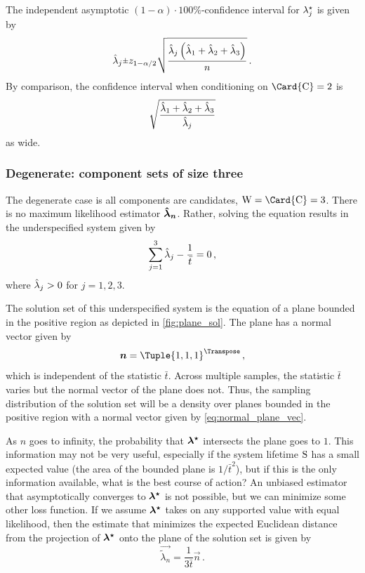 \documentclass[../main.tex]{subfiles}
\begin{document}
The independent asymptotic $(1-\alpha) \cdot 100 \%$-confidence interval for ${\lambda}^{\star}_j$ is given by
\begin{equation}
    \estimator{\lambda}_j \raisebox{.2ex}{$\scriptstyle\pm$} z_{1 - \alpha/2}
    \sqrt{
        \frac
        {
            \estimator{\lambda}_j \left(\estimator{\lambda}_1 + \estimator{\lambda}_2 + \estimator{\lambda}_3\right)
        }
        {n}
    }\,.
\end{equation}
By comparison, the confidence interval when conditioning on $\Card{\rvcand} = 2$ is
\begin{equation}
    \sqrt{
        \frac
        {
            \hat{\lambda}_1 + \hat{\lambda}_2 + \hat{\lambda}_3
        }
        {
            \hat{\lambda}_j
        }
    }
\end{equation}
as wide.

\subsubsection{Degenerate: component sets of size three}
The degenerate case is all components are candidates, $\RV{W} = \Card{\rvcand} = 3$. There is no maximum likelihood estimator $\boldsymbol{\hat{\boldsymbol{\lambda}}_n}$. Rather, solving the equation results in the underspecified system given by
\begin{equation}
    \sum_{j=1}^{3} \hat{\lambda}_j - \frac{1}{\bar{t}} = 0\,,
\end{equation}
where $\hat{\lambda}_j > 0$ for $j=1,2,3$.

The solution set of this underspecified system is the equation of a plane bounded in the positive region as depicted in \cref{fig:plane_sol}. The plane has a normal vector given by
\begin{equation}
\label{eq:normal_plane_vec}
    \vec{n} = \Tuple{1,1,1}^\Transpose\,,
\end{equation}
which is independent of the statistic $\bar{t}$. Across multiple samples, the statistic $\bar{t}$ varies but the normal vector of the plane does not. Thus, the sampling distribution of the solution set will be a density over planes bounded in the positive region with a normal vector given by \cref{eq:normal_plane_vec}.

As $n$ goes to infinity, the probability that $\boldsymbol{{\lambda}^{\star}}$ intersects the plane goes to $1$. This information may not be very useful, especially if the system lifetime $\mathrm{S}$ has a small expected value (the area of the bounded plane is $1/\bar{t}^2$), but if this is the only information available, what is the best course of action? An unbiased estimator that asymptotically converges to $\boldsymbol{{\lambda}^{\star}}$ is not possible, but we can minimize some other loss function. If we assume $\boldsymbol{{\lambda}^{\star}}$ takes on any supported value with equal likelihood, then the estimate that minimizes the expected Euclidean distance from the projection of $\boldsymbol{{\lambda}^{\star}}$ onto the plane of the solution set is given by
\begin{equation}
    \vec{\tilde\lambda_n} = \frac{1}{3 \bar{t}} \vec{n}\,.
\end{equation}
\end{document}
